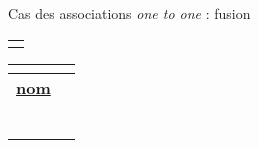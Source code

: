 \documentclass[10pt]{beamer}
\begin{document}
\begin{frame}{\Ctitle}{\stitle}
\begin{block}{Cas des associations \textit{one to one} : fusion}
\begin{center}
\begin{tabular}{|p{2cm}|}
				\hline
				\cellcolor{white}{\footnotesize longitude}                            \\
				\hline
				\cellcolor{white}{\footnotesize latitude}                             \\
				\hline
			\end{tabular}  \quad \quad {}
			\begin{tabular}{|p{2cm}>{\footnotesize \sc}r|}
				\hline
				\multicolumn{2}{|c|}{\cellcolor{lightgray}{\small \textbf{Pays}}}                   \\
				\hline
				\cellcolor{white}\underline{\textbf {\footnotesize nom}} & \cellcolor{white}{text}  \\
				\hline
				\cellcolor{white}{\footnotesize region}                  & \cellcolor{white}{text}  \\
				\hline
				\cellcolor{white}{\footnotesize population}              & \cellcolor{white}{int}   \\
				\hline
				\cellcolor{white}{\footnotesize surface}                 & \cellcolor{white}{float} \\
				\hline
				\cellcolor{white}{\footnotesize capitale}                & \cellcolor{white}{text}  \\
				\hline
				\cellcolor{white}{\footnotesize longitude}               & \cellcolor{white}{float} \\
				\hline
				\cellcolor{white}{\footnotesize latitude}                & \cellcolor{white}{float} \\
				\hline
			\end{tabular}
		\end{center}
	\end{block}
\end{frame}
\end{document}
